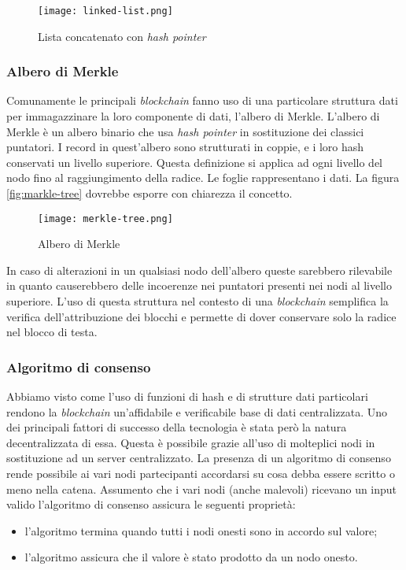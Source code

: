 \begin{figure}[!h]
    \centering
    \texttt{[image: linked-list.png]}
    \caption{Lista concatenato con \emph{hash pointer}}
    \label{fig:linked-list} 
\end{figure}

\subsubsection{Albero di Merkle}
Comunamente le principali \emph{blockchain} fanno uso di una particolare struttura dati per immagazzinare la loro componente di dati, l'albero di Merkle. L'albero di Merkle è un albero binario che usa \emph{hash pointer} in sostituzione dei classici puntatori. I record in quest'albero sono strutturati in coppie, e i loro hash conservati un livello superiore. Questa definizione si applica ad ogni livello del nodo fino al raggiungimento della radice. Le foglie rappresentano i dati. La figura \ref{fig:markle-tree} dovrebbe esporre con chiarezza il concetto.

\begin{figure}[!h]
    \centering
    \texttt{[image: merkle-tree.png]}
    \caption{Albero di Merkle}
    \label{fig:merkle-tree} 
\end{figure}

In caso di alterazioni in un qualsiasi nodo dell'albero queste sarebbero rilevabile in quanto causerebbero delle incoerenze nei puntatori presenti nei nodi al livello superiore. L'uso di questa struttura nel contesto di una \emph{blockchain} semplifica la verifica dell'attribuzione dei blocchi e permette di dover conservare solo la radice nel blocco di testa.

\subsubsection{Algoritmo di consenso}
Abbiamo visto come l'uso di funzioni di hash e di strutture dati particolari rendono la \emph{blockchain} un'affidabile e verificabile base di dati centralizzata. Uno dei principali fattori di successo della tecnologia è stata però la natura decentralizzata di essa. Questa è possibile grazie all'uso di molteplici nodi in sostituzione ad un server centralizzato. La presenza di un algoritmo di consenso rende possibile ai vari nodi partecipanti accordarsi su cosa debba essere scritto o meno nella catena. Assumento che i vari nodi (anche malevoli) ricevano un input valido l'algoritmo di consenso assicura le seguenti proprietà:
\begin{itemize}
    \item l'algoritmo termina quando tutti i nodi onesti sono in accordo sul valore;
    \item l'algoritmo assicura che il valore è stato prodotto da un nodo onesto. 
\end{itemize}

